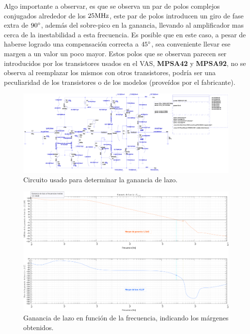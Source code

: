 Algo importante a observar, es que se observa un par de polos complejos conjugados alrededor de los $25 \si[per-mode=symbol]{\mega\hertz}$, este par de polos introducen un giro de fase extra de $90 \si[per-mode=symbol]{\degree}$, además del sobre-pico en la ganancia, llevando al amplificador mas cerca de la inestabilidad a esta frecuencia. Es posible que en este caso, a pesar de haberse logrado una compensación correcta a $45 \si[per-mode=symbol]{\degree}$, sea conveniente llevar ese margen a un valor un poco mayor. Estos polos que se observan parecen ser introducidos por los transistores usados en el VAS, \textbf{MPSA42} y \textbf{MPSA92}, no se observa al reemplazar los mismos con otros transistores, podría ser una peculiaridad de los transistores o de los modelos (proveídos por el fabricante).

\clearpage

\begin{figure}[H] %
\begin{center}
\includegraphics[width=0.93 \textheight, angle=90]{./img/circuits/amplifier_LOOP.png}
\caption{\label{fig:fig_circuit_compensation}\footnotesize{Circuito usado para determinar la ganancia de lazo.}}
\end{center}
\end{figure}

\clearpage

\begin{figure}[H] %
\begin{center}
\includegraphics[width=0.93 \textheight, angle=90]{./img/simulaciones/Loop/gain_loop.png}
\caption{\label{fig:fig_loop_gain}\footnotesize{Ganancia de lazo en función de la frecuencia, indicando los márgenes obtenidos.}}
\end{center}
\end{figure}

\clearpage